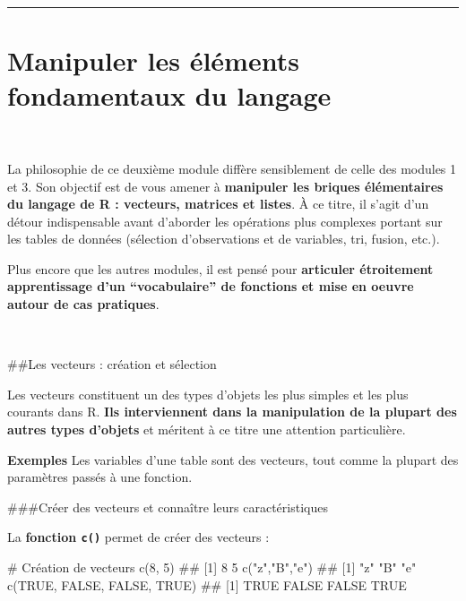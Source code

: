 \documentclass[12pt,twosided, notitlepage]{book}
\newenvironment{Shaded}{}{}
\newcommand{\CommentTok}[1]{\textcolor[rgb]{0.00,0.50,0.00}{#1}}
\newcommand{\DecValTok}[1]{#1}
\newcommand{\KeywordTok}[1]{\textcolor[rgb]{0.00,0.00,1.00}{#1}}
\newcommand{\NormalTok}[1]{#1}
\newcommand{\OtherTok}[1]{\textcolor[rgb]{1.00,0.25,0.00}{#1}}
\newcommand{\StringTok}[1]{\textcolor[rgb]{0.00,0.50,0.50}{#1}}
\renewenvironment{Shaded}{\begin{snugshade}}{\end{snugshade}}
\begin{document}
\begin{center}\rule{0.5\linewidth}{\linethickness}\end{center}

\chapter{Manipuler les éléments fondamentaux du langage}
 \minitoc

~

La philosophie de ce deuxième module diffère sensiblement de celle des
modules 1 et 3. Son objectif est de vous amener à \textbf{manipuler les
briques élémentaires du langage de R : vecteurs, matrices et listes}. À
ce titre, il s'agit d'un détour indispensable avant d'aborder les
opérations plus complexes portant sur les tables de données (sélection
d'observations et de variables, tri, fusion, etc.).

Plus encore que les autres modules, il est pensé pour \textbf{articuler
étroitement apprentissage d'un \enquote{vocabulaire} de fonctions et
mise en oeuvre autour de cas pratiques}.

~

\#\#Les vecteurs : création et sélection

Les vecteurs constituent un des types d'objets les plus simples et les
plus courants dans R. \textbf{Ils interviennent dans la manipulation de
la plupart des autres types d'objets} et méritent à ce titre une
attention particulière.

\textbf{Exemples} Les variables d'une table sont des vecteurs, tout
comme la plupart des paramètres passés à une fonction.

\#\#\#Créer des vecteurs et connaître leurs caractéristiques

La \textbf{fonction \texttt{c()}} permet de
créer des vecteurs :

\begin{Shaded}
\begin{Highlighting}[]
\CommentTok{# Création de vecteurs}
\KeywordTok{c}\NormalTok{(}\DecValTok{8}\NormalTok{, }\DecValTok{5}\NormalTok{)}
\NormalTok{  ## [1] 8 5}
\KeywordTok{c}\NormalTok{(}\StringTok{"z"}\NormalTok{,}\StringTok{"B"}\NormalTok{,}\StringTok{"e"}\NormalTok{)}
\NormalTok{  ## [1] "z" "B" "e"}
\KeywordTok{c}\NormalTok{(}\OtherTok{TRUE}\NormalTok{, }\OtherTok{FALSE}\NormalTok{, }\OtherTok{FALSE}\NormalTok{, }\OtherTok{TRUE}\NormalTok{)}
\NormalTok{  ## [1]  TRUE FALSE FALSE  TRUE}
\end{Highlighting}
\end{Shaded}
\end{document}
